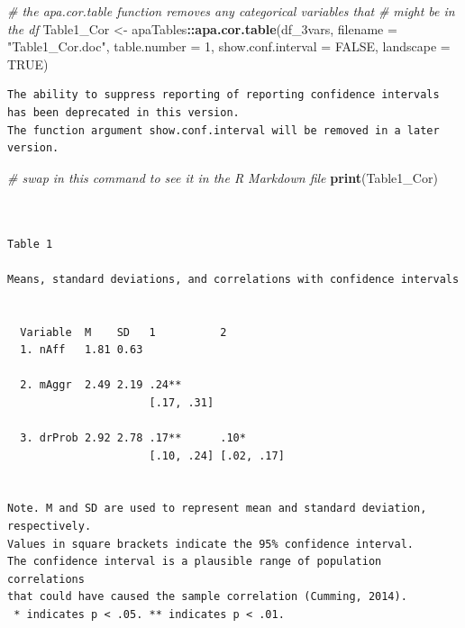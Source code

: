 \documentclass[
  11pt,
]{book}
\newenvironment{Shaded}{\begin{snugshade}}{\end{snugshade}}
\newcommand{\AttributeTok}[1]{\textcolor[rgb]{0.27,0.27,0.27}{#1}}
\newcommand{\CommentTok}[1]{\textcolor[rgb]{0.37,0.37,0.37}{\textit{#1}}}
\newcommand{\ConstantTok}[1]{\textcolor[rgb]{0.37,0.37,0.37}{#1}}
\newcommand{\DecValTok}[1]{\textcolor[rgb]{0.06,0.06,0.06}{#1}}
\newcommand{\FunctionTok}[1]{\textcolor[rgb]{0.27,0.27,0.27}{\textbf{#1}}}
\newcommand{\NormalTok}[1]{#1}
\newcommand{\OtherTok}[1]{\textcolor[rgb]{0.37,0.37,0.37}{#1}}
\newcommand{\SpecialCharTok}[1]{\textcolor[rgb]{0.43,0.43,0.43}{\textbf{#1}}}
\newcommand{\StringTok}[1]{\textcolor[rgb]{0.5,0.5,0.5}{#1}}
\begin{document}
\begin{Shaded}
\begin{Highlighting}[]
\CommentTok{\# the apa.cor.table function removes any categorical variables that}
\CommentTok{\# might be in the df}
\NormalTok{Table1\_Cor }\OtherTok{\textless{}{-}}\NormalTok{ apaTables}\SpecialCharTok{::}\FunctionTok{apa.cor.table}\NormalTok{(df\_3vars, }\AttributeTok{filename =} \StringTok{"Table1\_Cor.doc"}\NormalTok{,}
    \AttributeTok{table.number =} \DecValTok{1}\NormalTok{, }\AttributeTok{show.conf.interval =} \ConstantTok{FALSE}\NormalTok{, }\AttributeTok{landscape =} \ConstantTok{TRUE}\NormalTok{)}
\end{Highlighting}
\end{Shaded}

\begin{verbatim}
The ability to suppress reporting of reporting confidence intervals has been deprecated in this version.
The function argument show.conf.interval will be removed in a later version.
\end{verbatim}

\begin{Shaded}
\begin{Highlighting}[]
\CommentTok{\# swap in this command to see it in the R Markdown file}
\FunctionTok{print}\NormalTok{(Table1\_Cor)}
\end{Highlighting}
\end{Shaded}

\begin{verbatim}


Table 1 

Means, standard deviations, and correlations with confidence intervals
 

  Variable  M    SD   1          2         
  1. nAff   1.81 0.63                      
                                           
  2. mAggr  2.49 2.19 .24**                
                      [.17, .31]           
                                           
  3. drProb 2.92 2.78 .17**      .10*      
                      [.10, .24] [.02, .17]
                                           

Note. M and SD are used to represent mean and standard deviation, respectively.
Values in square brackets indicate the 95% confidence interval.
The confidence interval is a plausible range of population correlations 
that could have caused the sample correlation (Cumming, 2014).
 * indicates p < .05. ** indicates p < .01.
 
\end{verbatim}
\end{document}
